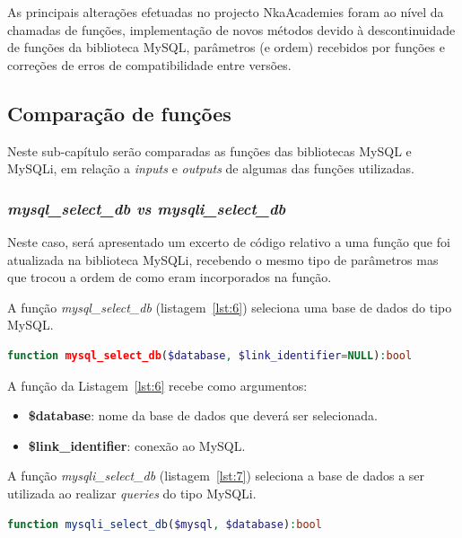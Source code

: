 As principais alterações efetuadas no projecto NkaAcademies foram ao nível da chamadas de funções, implementação de novos métodos devido à descontinuidade de funções da biblioteca MySQL, parâmetros (e ordem) recebidos por funções e correções de erros de compatibilidade entre versões.

\subsection{Comparação de funções}

Neste sub-capítulo serão comparadas as funções das bibliotecas MySQL e MySQLi, em relação a \textit{inputs} e \textit{outputs} de algumas das funções utilizadas.

\subsubsection{\textit{mysql\_select\_db vs mysqli\_select\_db}}

Neste caso, será apresentado um excerto de código relativo a uma função que foi atualizada na biblioteca MySQLi, recebendo o mesmo tipo de parâmetros mas que trocou a ordem de como eram incorporados na função.

A função \textit{mysql\_select\_db} (listagem~\ref{lst:6}) seleciona uma base de dados do tipo MySQL.

\begin{lstlisting}[language={php},
                   caption={Função mysql\_select\_db.},
                   label=lst:6]
function mysql_select_db($database, $link_identifier=NULL):bool

\end{lstlisting}

A função da Listagem~\ref{lst:6} recebe como argumentos:
\begin{itemize}
  \item \textbf{\$database}: nome da base de dados que deverá ser selecionada.
  \item \textbf{\$link\_identifier}: conexão ao MySQL.
\end{itemize}


A função \textit{mysqli\_select\_db} (listagem~\ref{lst:7}) seleciona a base de dados a ser utilizada ao realizar \textit{queries} do tipo MySQLi.

\begin{lstlisting}[language={php},
                   caption={Função mysqli\_select\_db.},
                   label=lst:7]
    	function mysqli_select_db($mysql, $database):bool

\end{lstlisting}

